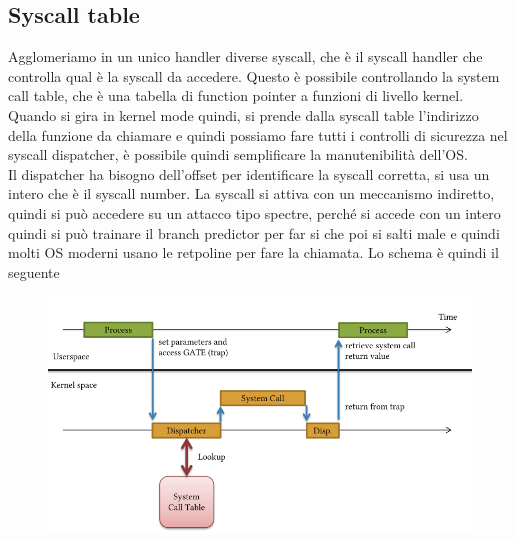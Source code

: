 \documentclass[12pt, oneside]{extbook} %
\begin{document}
\subsection{Syscall table}
Agglomeriamo in un unico handler diverse syscall, che è il syscall handler che controlla qual è la syscall da accedere. Questo è possibile controllando la system call table, che è una tabella di function pointer a funzioni di livello kernel.\\Quando si gira in kernel mode quindi, si prende dalla syscall table l'indirizzo della funzione da chiamare e quindi possiamo fare tutti i controlli di sicurezza nel syscall dispatcher, è possibile quindi semplificare la manutenibilità dell'OS.\\Il dispatcher ha bisogno dell'offset per identificare la syscall corretta, si usa un intero che è il syscall number. La syscall si attiva con un meccanismo indiretto, quindi si può accedere su un attacco tipo spectre, perché si accede con un intero quindi si può trainare il branch predictor per far si che poi si salti male e quindi molti OS moderni usano le retpoline per fare la chiamata. Lo schema è quindi il seguente\\
\begin{figure}[!h]
	\includegraphics[scale=0.3]{immagini/disp_scheme.png}
\end{figure}
\end{document}

